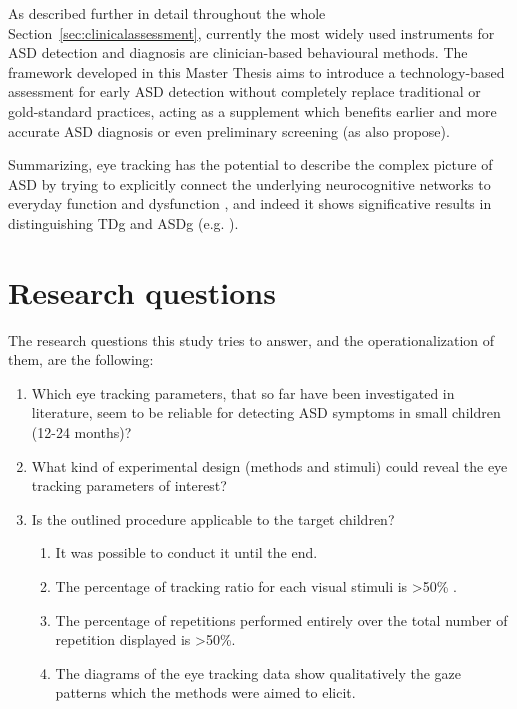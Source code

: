 As described further in detail throughout the whole Section~\ref{sec:clinicalassessment}, currently the most widely used instruments for ASD detection and diagnosis are clinician-based behavioural methods. The framework developed in this Master Thesis aims to introduce a technology-based assessment for early ASD detection without completely replace traditional or gold-standard practices, acting as a supplement which benefits earlier and more accurate ASD diagnosis or even preliminary screening (as \citealp{liu2015machinelearning} also propose).

Summarizing, eye tracking has the potential to describe the complex picture of ASD by trying to explicitly connect the underlying neurocognitive networks to everyday function and dysfunction \citep{falck-ytter2013eyetrackingASD}, and indeed it shows significative results in distinguishing TDg and ASDg (e.g.  \citealp{boraston2007eyetrackingASD,papagiannopoulou2014review,bolte2016detection,johnson2016review}).






\section{Research questions}
\label{sec:researchquestions}

The research questions this study tries to answer, and the operationalization of them, are the following:
\begin{enumerate}
    \item Which eye tracking parameters, that so far have been investigated in literature, seem to be reliable for detecting ASD symptoms in small children (12-24 months)?
    \item What kind of experimental design (methods and stimuli) could reveal the eye tracking parameters of interest?
    \item Is the outlined procedure applicable to the target children?
    \begin{enumerate}[label*=\alph*.]
        \item It was possible to conduct it until the end.
        \item The percentage of tracking ratio for each visual stimuli is >50\% \citep{sasson2012children}.
        \item The percentage of repetitions performed entirely over the total number of repetition displayed is >50\%.
        \item The diagrams of the eye tracking data show qualitatively the gaze patterns which the methods were aimed to elicit.
    \end{enumerate}
\end{enumerate}

